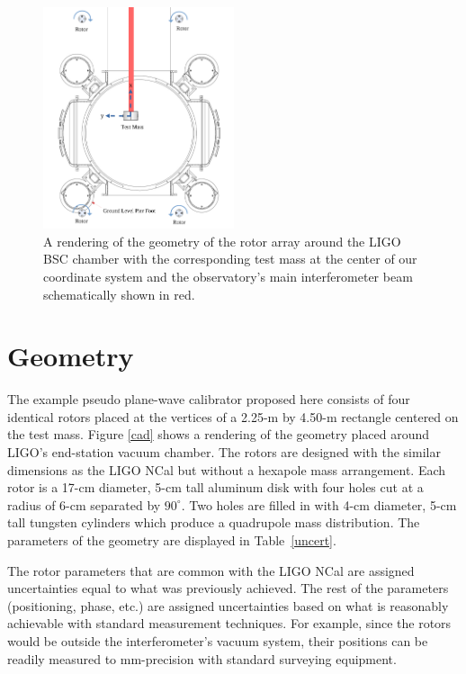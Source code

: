 \documentclass[superscriptaddress, twocolumn, prd]{revtex4-1}
\begin{document}
\begin{figure}[!h]
\centering \includegraphics[width=0.5\textwidth]{Super4BSCTopDownAxesSpinNew.pdf}
\caption{A rendering of the geometry of the rotor array around the LIGO BSC chamber with the corresponding test mass at the center of our coordinate system and the observatory's main interferometer beam schematically shown in red.}
\label{bsc} 
\end{figure}

\section{Geometry}

The example pseudo plane-wave calibrator proposed here consists of four identical rotors placed at the vertices of a 2.25-m by 4.50-m rectangle centered on the test mass. Figure \ref{cad} shows a rendering of the geometry placed around LIGO's end-station vacuum chamber. The rotors are designed with the similar dimensions as the LIGO NCal \cite{ncal} but without a hexapole mass arrangement. Each rotor is a 17-cm diameter, 5-cm tall aluminum disk with four holes cut at a radius of 6-cm separated by $90^\circ$. Two holes are filled in with 4-cm diameter, 5-cm tall  tungsten cylinders which produce a quadrupole mass distribution. The parameters of the geometry are displayed in Table~\ref{uncert}.

The rotor parameters that are common with the LIGO NCal are assigned uncertainties equal to what was previously achieved. \cite{ncal} The rest of the parameters (positioning, phase, etc.) are assigned uncertainties based on what is reasonably achievable with standard measurement techniques. For example, since the rotors would be outside the interferometer's vacuum system, their positions can be readily measured to  mm-precision with standard surveying equipment. \cite{ncal}
\end{document}
